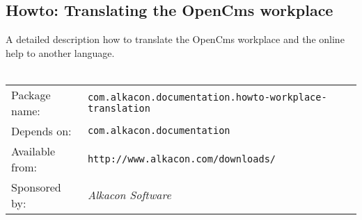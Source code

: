 \subsection{Howto: Translating the OpenCms workplace}
A detailed description how to translate the OpenCms workplace and the online help to another language.
\\
\\
\begin{tabular}{ll}
Package name: & {\tt com.alkacon.documentation.howto-workplace-translation}\\
Depends on: & {\tt com.alkacon.documentation}\\
Available from: & {\tt http://www.alkacon.com/downloads/}\\
Sponsored by: & {\em Alkacon Software}\\
\end{tabular}